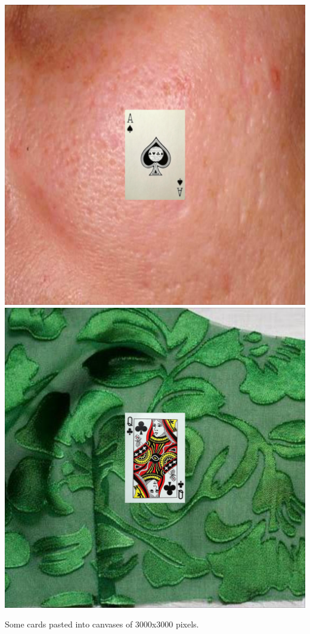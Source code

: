 \documentclass[a4paper]{article}
\begin{document}
\begin{minipage}{\columnwidth}
{\includegraphics[scale=0.04]{as_1}  \quad
\includegraphics[scale=0.04]{qc_1} }
\caption{Some cards pasted into canvases of 3000x3000 pixels.}
\label{fig-canvas}
\end{minipage}
\end{document}
